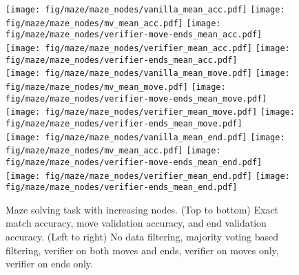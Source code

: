 \begin{figure}[ht!]
    \centering
    \texttt{[image: fig/maze/maze\_nodes/vanilla\_mean\_acc.pdf]}
    \texttt{[image: fig/maze/maze\_nodes/mv\_mean\_acc.pdf]}
    \texttt{[image: fig/maze/maze\_nodes/verifier-move-ends\_mean\_acc.pdf]}
    \texttt{[image: fig/maze/maze\_nodes/verifier\_mean\_acc.pdf]}
    \texttt{[image: fig/maze/maze\_nodes/verifier-ends\_mean\_acc.pdf]}    
    \\
    \texttt{[image: fig/maze/maze\_nodes/vanilla\_mean\_move.pdf]}
    \texttt{[image: fig/maze/maze\_nodes/mv\_mean\_move.pdf]}
    \texttt{[image: fig/maze/maze\_nodes/verifier-move-ends\_mean\_move.pdf]}
    \texttt{[image: fig/maze/maze\_nodes/verifier\_mean\_move.pdf]}
    \texttt{[image: fig/maze/maze\_nodes/verifier-ends\_mean\_move.pdf]}    
    \\
    \texttt{[image: fig/maze/maze\_nodes/vanilla\_mean\_end.pdf]}
    \texttt{[image: fig/maze/maze\_nodes/mv\_mean\_acc.pdf]}
    \texttt{[image: fig/maze/maze\_nodes/verifier-move-ends\_mean\_end.pdf]}
    \texttt{[image: fig/maze/maze\_nodes/verifier\_mean\_end.pdf]}
    \texttt{[image: fig/maze/maze\_nodes/verifier-ends\_mean\_end.pdf]}    
    \caption{ Maze solving task with increasing nodes. (Top to bottom) Exact match accuracy, move validation accuracy, and end validation accuracy.  (Left to right) No data filtering, majority voting based filtering, verifier on both moves and ends, verifier on moves only, verifier on ends only.}
    \label{fig:maze_verifier_nodes_full}
\end{figure}
